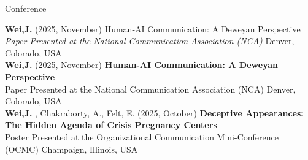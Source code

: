 \documentclass[
	11pt, %
]{resume} %
\begin{document}

\begin{rSection}{Conference}

    
	\textbf{Wei,J.} (2025, November) Human-AI Communication: A Deweyan Perspective\\
	\textit{Paper Presented at the National Communication Association (NCA)} \hfill Denver, Colorado, USA \\

    
	\textbf{Wei,J.} (2025, November)\textbf{ Human-AI Communication: A Deweyan Perspective}\\
	Paper Presented at the National Communication Association (NCA) \hfill Denver, Colorado, USA \\

	\textbf{Wei,J.} , Chakraborty, A., Felt, E. (2025, October) \textbf{Deceptive Appearances: The Hidden Agenda of Crisis Pregnancy Centers} \\
	Poster Presented at the Organizational Communication Mini-Conference (OCMC) \hfill Champaign, Illinois, USA \\
	
\end{rSection}

\end{document}
